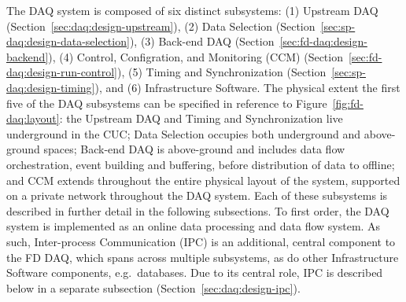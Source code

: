 The  DAQ system is composed of six distinct subsystems: (1) Upstream
DAQ (Section~\ref{sec:daq:design-upstream}), (2) Data Selection
(Section~\ref{sec:sp-daq:design-data-selection}), (3) Back-end DAQ (Section~\ref{sec:fd-daq:design-backend}), (4) Control,
Configration, and Monitoring (CCM) (Section~\ref{sec:fd-daq:design-run-control}), (5) Timing and
Synchronization (Section~\ref{sec:sp-daq:design-timing}), and (6) Infrastructure Software. The physical extent
the first five of the DAQ subsystems
can be specified in reference to Figure~\ref{fig:fd-daq:layout}: the
Upstream DAQ and Timing and Synchronization live underground in the CUC; Data Selection occupies
both underground and above-ground spaces; Back-end DAQ is above-ground
and includes data flow orchestration, event building and buffering, before distribution of data
to offline; and CCM extends throughout the entire physical layout of the
system, supported on a private network throughout the DAQ system. Each of these subsystems is described in further
detail in the following subsections. To first order, the DAQ system
is implemented as an online data processing and data flow system. As
such, Inter-process Communication (IPC) is an
additional, central component to the FD DAQ, which spans across multiple
subsystems, as do other Infrastructure Software components, e.g.~databases. Due
to its central role, IPC is described below in a separate subsection (Section~\ref{sec:daq:design-ipc}).

